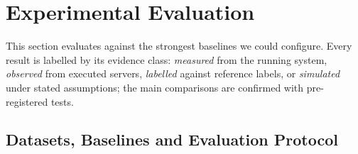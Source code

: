 \section{Experimental Evaluation}
\label{sec:ev}

This section evaluates \pamcp{} against the strongest baselines we could configure. Every result is labelled by
its evidence class: \emph{measured} from the running system, \emph{observed} from executed servers,
\emph{labelled} against reference labels, or \emph{simulated} under stated assumptions; the main comparisons are
confirmed with pre-registered tests.

\subsection{Datasets, Baselines and Evaluation Protocol}
\label{sec:ev-setup}

